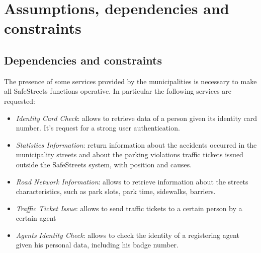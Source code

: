 \documentclass[a4paper]{report}
\begin{document}
\section{Assumptions, dependencies and constraints}
\subsection{Dependencies and constraints}
\label{SS-Dep&Const} 
The presence of some services provided by the municipalities is necessary to make all SafeStreets functions operative. In particular the following services are requested:
\begin{itemize}
\item \textit{Identity Card Check}: allows to retrieve data of a person given its identity card number.  It's request for a strong user authentication.
\item \textit{Statistics Information}: return information about the accidents occurred in the municipality streets and about the parking violations traffic tickets issued outside the SafeStreets system, with position and causes.
\item \textit{Road Network Information}: allows to retrieve information about the streets characteristics, such as park slots, park time, sidewalks, barriers.
\item \textit{Traffic Ticket Issue}: allows to send traffic tickets to a certain person by a certain agent
\item \textit{Agents Identity Check}: allows to check the identity of a registering agent given his personal data, including his badge number. 
\end{itemize}
\end{document}

